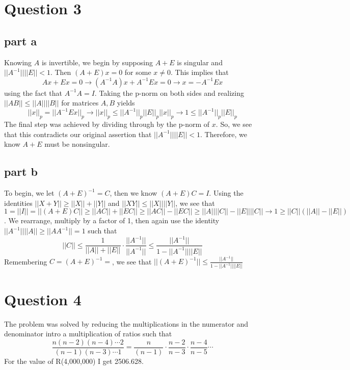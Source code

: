 \documentclass[a4paper,12pt]{article}
\begin{document}
\section{Question 3}
\subsection{part a}
Knowing $A$ is invertible, we begin by supposing $A+E$ is singular and $||A^{-1}|| ||E|| < 1$. Then $(A+E)x=0$ for some $x\neq0$. This implies that
\begin{equation}
Ax+Ex=0\rightarrow (A^{-1}A)x+A^{-1}Ex=0 \rightarrow x=-A^{-1}Ex
\end{equation} using the fact that $A^{-1}A=I$. Taking the p-norm on both sides and realizing $||AB||\leq ||A|| ||B||$ for matrices $A,B$ yields 
\begin{equation}
||x||_p =||A^{-1}Ex||_p \rightarrow ||x||_p \leq ||A^{-1}||_p||E||_p ||x||_p \rightarrow 1 \leq ||A^{-1}||_p||E||_p 
\end{equation} The final step was achieved by dividing through by the p-norm of $x$. So, we see that this contradicts our original assertion that $||A^{-1}|| ||E|| < 1$. Therefore, we know $A+E$ must be nonsingular.

\subsection{part b}
To begin, we let $(A+E)^{-1}=C$, then we know $(A+E)C=I$. Using the identities $|| X +Y || \ge || X || + || Y ||$ and $||XY||\leq ||X|| ||Y||$, we see that $1=|| I || = ||(A+E)C|| \ge ||AC|| + ||EC|| \ge ||AC|| - ||EC|| \ge ||A||||C|| - ||E||||C|| \rightarrow 1 \ge ||C||(||A|| - ||E||)$. We rearrange, multiply by a factor of 1, then again use the identity $||A^{-1}||||A||\ge ||AA^{-1}||=1$ such that
\begin{equation}
||C|| \leq \frac{1}{||A|| + ||E||} \cdot \frac{||A^{-1}||}{||A^{-1}||} \leq \frac{||A^{-1}||}{1-||A^{-1}||||E||}
\end{equation} Remembering $C=(A+E)^{-1}=$, we see that $||(A+E)^{-1}|| \leq \frac{||A^{-1}||}{1-||A^{-1}||||E||}$
  
 \section{Question 4}
The problem was solved by reducing the multiplications in the numerator and denominator intro a multiplication of ratios such that
\begin{equation}
\frac{n(n-2)(n-4)\cdots 2}{(n-1)(n-3)\cdots1} = \frac{n}{(n-1)} \cdot \frac{n-2}{n-3} \cdot \frac{n-4}{n-5}\cdots
\end{equation}
 For the value of R(4,000,000) I get 2506.628.
 
\end{document}
